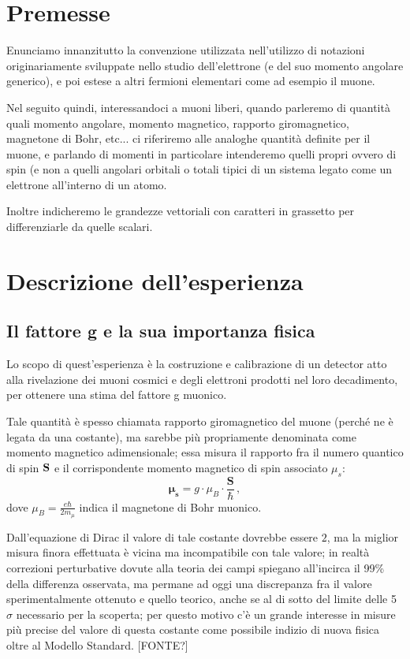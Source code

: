 \section{Premesse}

Enunciamo innanzitutto la convenzione utilizzata nell'utilizzo di notazioni originariamente sviluppate nello studio dell'elettrone (e del suo momento angolare generico), e poi estese a altri fermioni elementari come ad esempio il muone. \par
Nel seguito quindi, interessandoci a muoni liberi, quando parleremo di quantità quali momento angolare, momento magnetico, rapporto giromagnetico, magnetone di Bohr, etc... ci riferiremo alle analoghe quantità definite per il muone, e parlando di momenti in particolare intenderemo quelli propri ovvero di spin (e non a quelli angolari orbitali o totali tipici di un sistema legato come un elettrone all'interno di un atomo. \par
Inoltre indicheremo le grandezze vettoriali con caratteri in grassetto per differenziarle da quelle scalari. \par

\section{Descrizione dell'esperienza}
\subsection{Il fattore g e la sua importanza fisica}
Lo scopo di quest'esperienza è la costruzione e calibrazione di un detector atto alla rivelazione dei muoni cosmici e degli elettroni prodotti nel loro decadimento, per ottenere una stima del fattore g muonico. \par
Tale quantità è spesso chiamata rapporto giromagnetico del muone (perch\'e ne è legata da una costante), ma sarebbe più propriamente denominata come momento magnetico adimensionale; essa misura il rapporto fra il numero quantico di spin $\bf{S}$ e il corrispondente momento magnetico di spin associato $\mu_s$:
\begin{equation}
	\boldsymbol{\mu_s}=g\cdot \mu_B\cdot \frac{ \mathbf{S}}{\hbar} \, ,
	\label{eq:magnetic_moment}
\end{equation}
dove $\mu_B=\frac{e \hbar}{2 m_{\mu}}$ indica il magnetone di Bohr muonico. \par
Dall'equazione di Dirac il valore di tale costante dovrebbe essere $2$, ma la miglior misura finora effettuata è vicina ma incompatibile con tale valore; in realtà correzioni perturbative dovute alla teoria dei campi spiegano all'incirca il 99\% della differenza osservata, ma permane ad oggi una discrepanza fra il valore sperimentalmente ottenuto e quello teorico, anche se al di sotto del limite delle 5 $\sigma$ necessario per la scoperta; per questo motivo c'è un grande interesse in misure più precise del valore di questa costante come possibile indizio di nuova fisica oltre al Modello Standard. [FONTE?] \par

